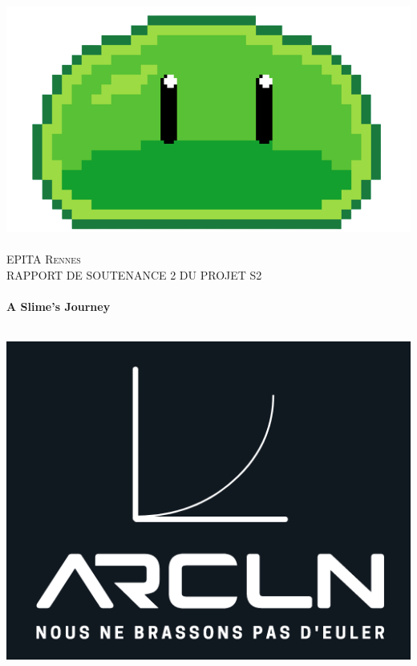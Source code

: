 
\begin{titlepage}
  \begin{sffamily}
  \begin{center}

  
    \includegraphics[scale=0.3]{logo}~\\[1.5cm]

    \textsc{\LARGE EPITA Rennes}\\[0.5cm]

    \textsc{\Large RAPPORT DE SOUTENANCE 2 DU PROJET S2}\\[1.5cm]

    \HRule \\[0.4cm]
     { \huge \bfseries  A Slime's Journey \\[0.4cm] }

    \HRule \\[2cm]
    \includegraphics[scale=0.4]{arcln}
     \\[0.5cm]


\end{center}
\end{sffamily}
\end{titlepage}
